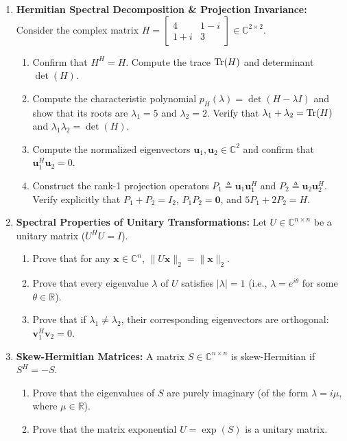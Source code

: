 \begin{enumerate}[label=\textbf{P\arabic*.}]
    \item \textbf{Hermitian Spectral Decomposition \& Projection Invariance:}
    Consider the complex matrix $H = \begin{bmatrix} 4 & 1 - i \\ 1 + i & 3 \end{bmatrix} \in \mathbb{C}^{2 \times 2}$.
    \begin{enumerate}[label=(\alph*)]
        \item Confirm that $H^H = H$. Compute the trace $\operatorname{Tr}(H)$ and determinant $\det(H)$.
        \item Compute the characteristic polynomial $p_H(\lambda) = \det(H - \lambda I)$ and show that its roots are $\lambda_1 = 5$ and $\lambda_2 = 2$. Verify that $\lambda_1 + \lambda_2 = \operatorname{Tr}(H)$ and $\lambda_1 \lambda_2 = \det(H)$.
        \item Compute the normalized eigenvectors $\mathbf{u}_1, \mathbf{u}_2 \in \mathbb{C}^2$ and confirm that $\mathbf{u}_1^H \mathbf{u}_2 = 0$.
        \item Construct the rank-1 projection operators $P_1 \triangleq \mathbf{u}_1 \mathbf{u}_1^H$ and $P_2 \triangleq \mathbf{u}_2 \mathbf{u}_2^H$. Verify explicitly that $P_1 + P_2 = I_2$, $P_1 P_2 = \mathbf{0}$, and $5 P_1 + 2 P_2 = H$.
    \end{enumerate}

    \item \textbf{Spectral Properties of Unitary Transformations:}
    Let $U \in \mathbb{C}^{n \times n}$ be a unitary matrix ($U^H U = I$).
    \begin{enumerate}[label=(\alph*)]
        \item Prove that for any $\mathbf{x} \in \mathbb{C}^n$, $\|U\mathbf{x}\|_2 = \|\mathbf{x}\|_2$.
        \item Prove that every eigenvalue $\lambda$ of $U$ satisfies $|\lambda| = 1$ (i.e., $\lambda = e^{i\theta}$ for some $\theta \in \mathbb{R}$).
        \item Prove that if $\lambda_1 \ne \lambda_2$, their corresponding eigenvectors are orthogonal: $\mathbf{v}_1^H \mathbf{v}_2 = 0$.
    \end{enumerate}

    \item \textbf{Skew-Hermitian Matrices:}
    A matrix $S \in \mathbb{C}^{n \times n}$ is skew-Hermitian if $S^H = -S$.
    \begin{enumerate}[label=(\alph*)]
        \item Prove that the eigenvalues of $S$ are purely imaginary (of the form $\lambda = i\mu$, where $\mu \in \mathbb{R}$).
        \item Prove that the matrix exponential $U = \exp(S)$ is a unitary matrix.
    \end{enumerate}


\end{enumerate}
